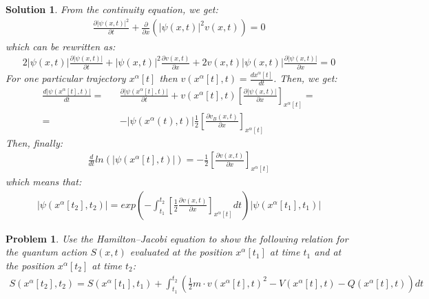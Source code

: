 \documentclass[nofootinbib, secnumarabic, amsmath, nobibnotes,10pt,aps,pra]{revtex4-1}
\newtheorem{problem}{Problem}
\newtheorem{solution}{Solution}
\begin{document}
\begin{solution}
From the continuity equation, we get:
\begin{eqnarray}
\frac{\partial |\psi(x,t)|^2}{\partial t}+\frac{\partial }{\partial x} \left(|\psi(x,t)|^2 v(x,t)\right)=0\nonumber
\end{eqnarray}
which can be rewritten as: 
\begin{eqnarray}
2|\psi(x,t)|\frac{\partial |\psi(x,t)|}{\partial t}+|\psi(x,t)|^2\frac{\partial v(x,t)}{\partial x}+2v(x,t)|\psi(x,t)|\frac{\partial |\psi(x,t)|}{\partial x}=0\nonumber
\end{eqnarray}
For one particular trajectory $x^{\alpha}[t]$ then $v(x^{\alpha}[t],t)=\frac {dx^{\alpha}[t]}{dt}$. Then, we get: 
\begin{eqnarray}
\frac{d |\psi(x^{\alpha}[t],t)|}{dt}=&&\frac{\partial |\psi(x^{\alpha}[t],t)|}{\partial t}+v(x^{\alpha}[t],t)\left[\frac{\partial |\psi(x,t)|}{\partial x}\right]_{x^{\alpha}[t]}=\nonumber\\=&&-|\psi(x^{\alpha}(t),t)|\frac{1}{2}\left[\frac{\partial v_B(x,t)}{\partial x}\right]_{x^{\alpha}[t]}\nonumber
\end{eqnarray}
Then, finally:
\begin{eqnarray}
\frac{d}{dt}  ln \left(|\psi(x^{\alpha}[t],t)|\right)=-\frac{1}{2}\left[ \frac{\partial v(x,t)}{\partial x}\right]_{x^{\alpha}[t]}\nonumber
\end{eqnarray}
which means that:
\begin{eqnarray}
|\psi(x^{\alpha}[t_2],t_2)|=exp\left(-\int_{t_1}^{t_2}\left[\frac{1}{2}\frac{\partial v(x,t)}{\partial x}\right]_{x^{\alpha}[t]}dt \right) |\psi(x^{\alpha}[t_1],t_1)|\nonumber
\end{eqnarray}
\end{solution}


\begin{problem} \label{om.P10}
Use the Hamilton--Jacobi equation to show the following relation for the quantum action $S(x,t)$ evaluated at the position $x^{\alpha}[t_1]$ at time $t_1$ and at the position $x^{\alpha}[t_2]$ at time $t_2$:
\begin{eqnarray}
S(x^{\alpha}[t_2],t_2)=S(x^{\alpha}[t_1],t_1) +\int_{t_1}^{t_2}\left( \frac{1}{2}m\cdot v(x^{\alpha}[t],t)^2 -V(x^{\alpha}[t],t)-Q(x^{\alpha}[t],t)\right)dt \nonumber
\end{eqnarray}
\end{problem}
\end{document}
